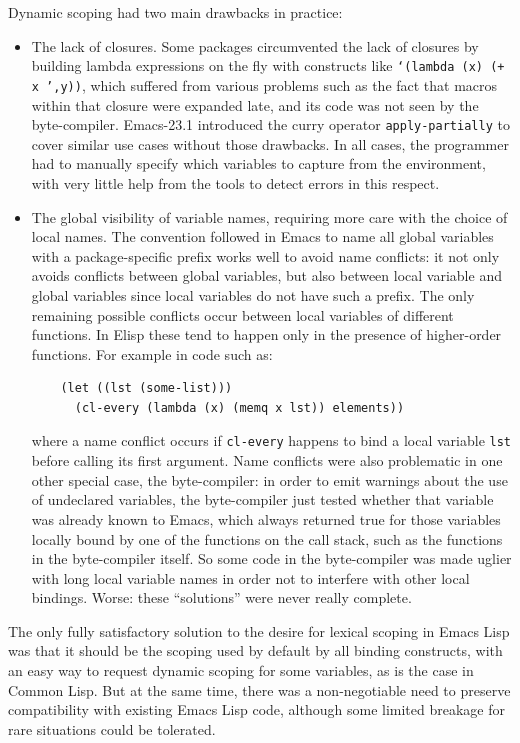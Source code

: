 \documentclass[format=acmsmall, review]{acmart}
\newcommand \Elisp {Emacs Lisp}
\begin{document}
Dynamic scoping had two main drawbacks in practice:
\begin{itemize}
\item The lack of closures.
  Some packages circumvented the lack of closures
  by building lambda expressions on the fly with constructs like
  \texttt{`(lambda (x) (+ x ',y))}, which suffered from various problems
  such as the fact that macros within that closure were expanded late, and
  its code was not seen by the byte-compiler.  Emacs-23.1 introduced the
  curry operator \texttt{apply-partially} to cover similar use cases without
  those drawbacks.  In all cases, the programmer had to manually specify
  which variables to capture from the environment, with very little help
  from the tools to detect errors in this respect.
\item The global visibility of variable names, requiring more care with the
  choice of local names.  The convention followed in Emacs to name all
  global variables with a package-specific prefix works well to avoid name
  conflicts: it not only avoids conflicts between global variables, but also
  between local variable and global variables since local variables do not
  have such a prefix.  The only remaining possible conflicts occur between
  local variables of different functions.  In Elisp these tend to happen only
  in the presence of higher-order functions.  For example in code such as:
\begin{verbatim}
    (let ((lst (some-list)))
      (cl-every (lambda (x) (memq x lst)) elements))
\end{verbatim}
  where a name conflict occurs if \texttt{cl-every} happens to bind a local
  variable \texttt{lst} before calling its first argument.  Name conflicts
  were also problematic in one other special case, the byte-compiler: in
  order to emit warnings about the use of undeclared variables, the
  byte-compiler just tested whether that variable was already known to
  Emacs, which always returned true for those variables locally bound by one
  of the functions on the call stack, such as the functions in the
  byte-compiler itself.  So some code in the byte-compiler was made uglier
  with long local variable names in order not to interfere with other local
  bindings.  Worse: these ``solutions'' were never really complete.
\end{itemize}
The only fully satisfactory solution to the desire for lexical scoping in
\Elisp{} was that it should be the scoping used by default by all binding
constructs, with an easy way to request dynamic scoping for some
variables, as is the case in Common Lisp.  But at the same time, there was
a non-negotiable need to preserve compatibility with existing \Elisp{} code,
although some limited breakage for rare situations could be tolerated.
\end{document}
